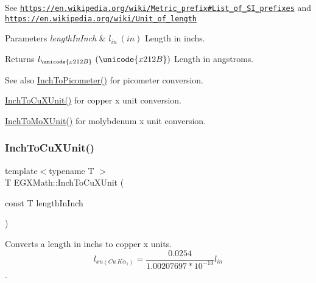 See \href{https://en.wikipedia.org/wiki/Metric_prefix#List_of_SI_prefixes}{\tt https\+://en.\+wikipedia.\+org/wiki/\+Metric\+\_\+prefix\#\+List\+\_\+of\+\_\+\+S\+I\+\_\+prefixes} and \href{https://en.wikipedia.org/wiki/Unit_of_length}{\tt https\+://en.\+wikipedia.\+org/wiki/\+Unit\+\_\+of\+\_\+length} 
\begin{DoxyParams}{Parameters}
{\em length\+In\+Inch} & $ l_{in}\ (in)$ Length in inchs. \\
\hline
\end{DoxyParams}
\begin{DoxyReturn}{Returns}
$ l_{\unicode{x212B}}\ (\unicode{x212B})$ Length in angstroms. 
\end{DoxyReturn}
\begin{DoxySeeAlso}{See also}
\mbox{\hyperlink{group___e_g_x_math-_conversions-_length_conversions-_imperial-_inch-_s_i_ga4220728877d0369e359689a0d8f8207c}{Inch\+To\+Picometer()}} for picometer conversion. 

\mbox{\hyperlink{group___e_g_x_math-_conversions-_length_conversions-_imperial-_inch-_non-_s_i_ga90455aa8e1aaf26567c2b11fc24730c9}{Inch\+To\+Cu\+X\+Unit()}} for copper x unit conversion. 

\mbox{\hyperlink{group___e_g_x_math-_conversions-_length_conversions-_imperial-_inch-_non-_s_i_ga938a029b99c57c1b765ebf23e82dee6e}{Inch\+To\+Mo\+X\+Unit()}} for molybdenum x unit conversion. 
\end{DoxySeeAlso}
\mbox{\label{group___e_g_x_math-_conversions-_length_conversions-_imperial-_inch-_non-_s_i_ga90455aa8e1aaf26567c2b11fc24730c9}} 
\subsubsection{\texorpdfstring{Inch\+To\+Cu\+X\+Unit()}{InchToCuXUnit()}}
{\footnotesize\ttfamily template$<$typename T $>$ \\
T E\+G\+X\+Math\+::\+Inch\+To\+Cu\+X\+Unit (\begin{DoxyParamCaption}\item[{const T}]{length\+In\+Inch }\end{DoxyParamCaption})}



Converts a length in inchs to copper x units. \[ l_{xu(Cu\ K\alpha_1)}=\frac{0.0254}{1.00207697*10^{-13}} l_{in}\]. 


